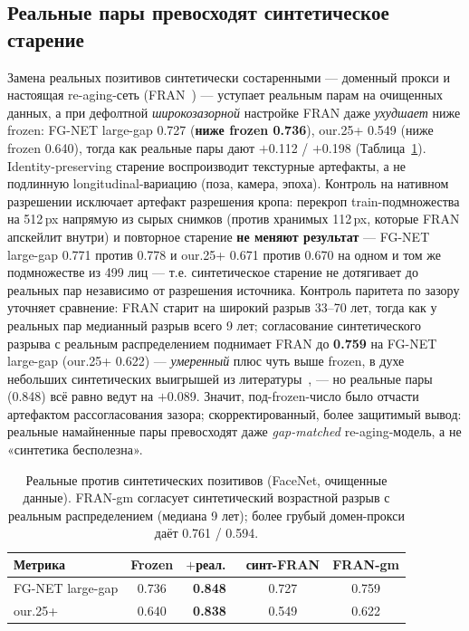 \documentclass[journal]{IEEEtran}
\begin{document}
\subsection{Реальные пары превосходят синтетическое старение}\label{sec:res-synth}
Замена реальных позитивов синтетически состаренными --- доменный прокси и настоящая re-aging-сеть (FRAN~\cite{zoss2022fran}) --- уступает реальным парам на очищенных данных, а при дефолтной \emph{широкозазорной} настройке FRAN даже \emph{ухудшает} ниже frozen: FG-NET large-gap 0.727 (\textbf{ниже frozen 0.736}), our.25+ 0.549 (ниже frozen 0.640), тогда как реальные пары дают $+$0.112 / $+$0.198 (Таблица~\ref{tab:synth}). Identity-preserving старение воспроизводит текстурные артефакты, а не подлинную longitudinal-вариацию (поза, камера, эпоха). Контроль на нативном разрешении исключает артефакт разрешения кропа: перекроп train-подмножества на 512\,px напрямую из сырых снимков (против хранимых 112\,px, которые FRAN апскейлит внутри) и повторное старение \textbf{не меняют результат} --- FG-NET large-gap 0.771 против 0.778 и our.25+ 0.671 против 0.670 на одном и том же подмножестве из 499 лиц --- т.е. синтетическое старение не дотягивает до реальных пар независимо от разрешения источника. Контроль паритета по зазору уточняет сравнение: FRAN старит на широкий разрыв 33--70 лет, тогда как у реальных пар медианный разрыв всего 9 лет; согласование синтетического разрыва с реальным распределением поднимает FRAN до \textbf{0.759} на FG-NET large-gap (our.25+ 0.622) --- \emph{умеренный} плюс чуть выше frozen, в духе небольших синтетических выигрышей из литературы~\cite{yao2024synthageing}, --- но реальные пары (0.848) всё равно ведут на $+$0.089. Значит, под-frozen-число было отчасти артефактом рассогласования зазора; скорректированный, более защитимый вывод: реальные намайненные пары превосходят даже \emph{gap-matched} re-aging-модель, а не «синтетика бесполезна».

\begin{table}[!t]
\renewcommand{\arraystretch}{1.15}
\caption{Реальные против синтетических позитивов (FaceNet, очищенные данные). FRAN-gm согласует синтетический возрастной разрыв с реальным распределением (медиана 9 лет); более грубый домен-прокси даёт 0.761 / 0.594.}
\label{tab:synth}
\centering
\footnotesize
\begin{tabular}{@{}lcccc@{}}
\toprule
Метрика & Frozen & $+$реал.\ & синт-FRAN & FRAN-gm \\
\midrule
FG-NET large-gap & 0.736 & \textbf{0.848} & 0.727 & 0.759 \\
our.25+ & 0.640 & \textbf{0.838} & 0.549 & 0.622 \\
\bottomrule
\end{tabular}
\end{table}
\end{document}
